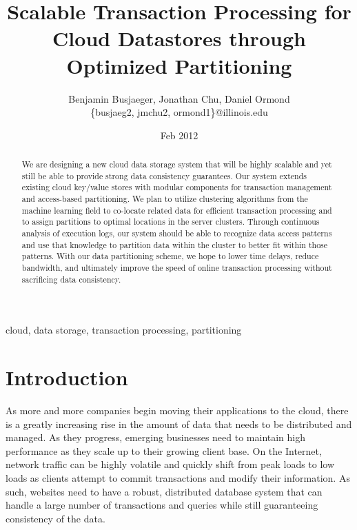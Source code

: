 \documentclass[10pt,final,journal]{IEEEtran}
\begin{document}
\title{Scalable Transaction Processing for Cloud Datastores through Optimized Partitioning}
\author{Benjamin Busjaeger, Jonathan Chu, Daniel Ormond \\
\{busjaeg2, jmchu2, ormond1\}@illinois.edu}
\date{Feb 2012}
\maketitle

\begin{abstract}
We are designing a new cloud data storage system that will be highly scalable and yet still be able to provide strong data consistency guarantees. Our system extends existing cloud key/value stores with modular components for transaction management and access-based partitioning. We plan to utilize clustering algorithms from the machine learning field to co-locate related data for efficient transaction processing and to assign partitions to optimal locations in the server clusters. Through continuous analysis of execution logs, our system should be able to recognize data access patterns and use that knowledge to partition data within the cluster to better fit within those patterns. With our data partitioning scheme, we hope to lower time delays, reduce bandwidth, and ultimately improve the speed of online transaction processing without sacrificing data consistency.
\end{abstract}

\begin{IEEEkeywords}
cloud, data storage, transaction processing, partitioning
\end{IEEEkeywords}

\section{Introduction}
As more and more companies begin moving their applications to the cloud, there is a greatly increasing rise in the amount of data that needs to be distributed and managed. As they progress, emerging businesses need to maintain high performance as they scale up to their growing client base. On the Internet, network traffic can be highly volatile and quickly shift from peak loads to low loads as clients attempt to commit transactions and modify their information. As such, websites need to have a robust, distributed database system that can handle a large number of transactions and queries while still guaranteeing consistency of the data. 
\end{document}
